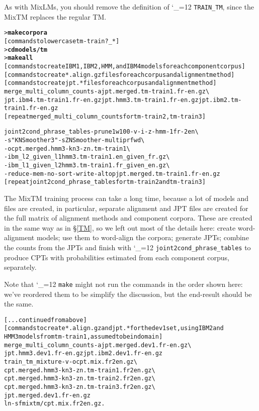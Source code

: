 \documentclass[11pt,letterpaper]{article}
\newcommand{\bs}{\textbackslash{}}
\def\code{\begingroup\catcode`\_=12 \codex}
\newcommand{\codex}[1]{\texttt{#1}\endgroup}
\begin{document}
As with MixLMs, you should remove the definition of \code{TRAIN_TM}, since the
MixTM replaces the regular TM.

\begin{small}
\begin{alltt}
   > \textbf{make corpora}
   [commands to lowercase tm-train?_*]
   > \textbf{cd models/tm}
   > \textbf{make all}
   [commands to create IBM1, IBM2, HMM, and IBM4 models for each component corpus]
   [commands to create *.align.gz files for each corpus and alignment method]
   [commands to create jpt.* files for each corpus and alignment method]
   merge_multi_column_counts -a jpt.merged.tm-train1.fr-en.gz \bs
      jpt.ibm4.tm-train1.fr-en.gz jpt.hmm3.tm-train1.fr-en.gz jpt.ibm2.tm-train1.fr-en.gz
   [repeat merged_multi_column_counts for tm-train2, tm-train3]

   joint2cond_phrase_tables -prune1w 100 -v -i -z -hmm -1 fr -2 en \bs
      -s "KNSmoother 3" -s ZNSmoother -multipr fwd \bs
      -o cpt.merged.hmm3-kn3-zn.tm-train1 \bs
      -ibm_l2_given_l1  hmm3.tm-train1.en_given_fr.gz \bs
      -ibm_l1_given_l2  hmm3.tm-train1.fr_given_en.gz \bs
      -reduce-mem -no-sort -write-al top jpt.merged.tm-train1.fr-en.gz
   [repeat joint2cond_phrase_tables for tm-train2 and tm-train3]
\end{alltt}
\end{small}

The MixTM training process can take a long time, because a lot of models and
files are created, in particular, separate alignment and JPT files are created
for the full matrix of alignment methods and component corpora.  These are
created in the same way as in \S\ref{TM}, so we left out most of the details
here: create word-alignment models; use them to word-align the corpora;
generate JPTs; combine the counts from the JPTs and finish with
\code{joint2cond_phrase_tables} to produce CPTs with probabilities estimated
from each component corpus, separately.

Note that \code{make} might not run the commands in the order shown here: we've
reordered them to be simplify the discussion, but the end-result should be the
same.

\begin{small}
\begin{alltt}
   [... continued from above]
   [commands to create *.align.gz and jpt.* for the dev1 set, using IBM2 and
    HMM3 models from tm-train1, assumed to be in domain]
   merge_multi_column_counts -a jpt.merged.dev1.fr-en.gz \bs
      jpt.hmm3.dev1.fr-en.gz jpt.ibm2.dev1.fr-en.gz
   train_tm_mixture -v -o cpt.mix.fr2en.gz \bs
      cpt.merged.hmm3-kn3-zn.tm-train1.fr2en.gz \bs
      cpt.merged.hmm3-kn3-zn.tm-train2.fr2en.gz \bs
      cpt.merged.hmm3-kn3-zn.tm-train3.fr2en.gz \bs
      jpt.merged.dev1.fr-en.gz
   ln -sf mixtm/cpt.mix.fr2en.gz .
\end{alltt}
\end{small}
\end{document}
